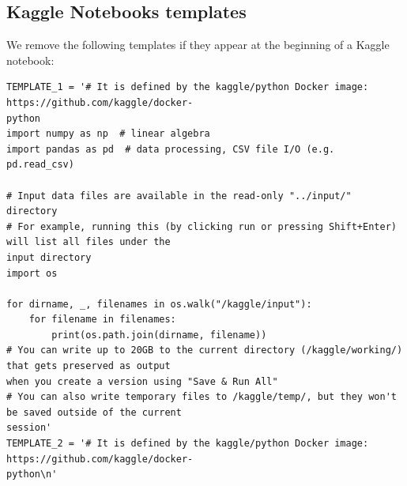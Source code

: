 \documentclass[10pt]{article} %
\begin{document}
\subsection{Kaggle Notebooks templates}
\label{appendix:kaggle_templates}
We remove the following templates if they appear at the beginning of a Kaggle notebook:

\begin{verbatim}
TEMPLATE_1 = '# It is defined by the kaggle/python Docker image: https://github.com/kaggle/docker-
python
import numpy as np  # linear algebra
import pandas as pd  # data processing, CSV file I/O (e.g. pd.read_csv)

# Input data files are available in the read-only "../input/" directory
# For example, running this (by clicking run or pressing Shift+Enter) will list all files under the 
input directory
import os

for dirname, _, filenames in os.walk("/kaggle/input"):
    for filename in filenames:
        print(os.path.join(dirname, filename))
# You can write up to 20GB to the current directory (/kaggle/working/) that gets preserved as output
when you create a version using "Save & Run All"
# You can also write temporary files to /kaggle/temp/, but they won't be saved outside of the current
session'
TEMPLATE_2 = '# It is defined by the kaggle/python Docker image: https://github.com/kaggle/docker-
python\n'
\end{verbatim}
\end{document}
